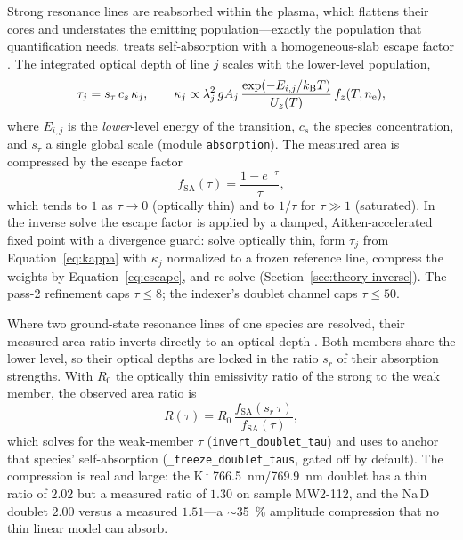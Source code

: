 Strong resonance lines are reabsorbed within the plasma, which flattens their cores
and understates the emitting population---exactly the population that quantification
needs. \alibz{} treats self-absorption with a homogeneous-slab escape factor
\citep{cowan1948selfabsorption,irons1979escape}. The
integrated optical depth of line $j$ scales with the lower-level population,
%
\begin{equation}
  \label{eq:kappa}
  \tau_j = s_\tau\,c_s\,\kappa_j,
  \qquad
  \kappa_j \propto \lambda_j^2\,gA_j\,
    \frac{\exp(-E_{i,j}/k_{\mathrm{B}} T)}{U_z(T)}\,f_z(T,n_{\mathrm{e}}),
\end{equation}
%
where $E_{i,j}$ is the \emph{lower}-level energy of the transition, $c_s$ the
species concentration, and $s_\tau$ a single global scale (module \texttt{absorption}).
The measured area is compressed by the escape factor
%
\begin{equation}
  \label{eq:escape}
  f_\mathrm{SA}(\tau) = \frac{1-e^{-\tau}}{\tau},
\end{equation}
%
which tends to $1$ as $\tau\!\rightarrow\!0$ (optically thin) and to $1/\tau$ for
$\tau\gg1$ (saturated). In the inverse solve the escape factor is applied by a
damped, Aitken-accelerated fixed point with a divergence guard: solve optically thin,
form $\tau_j$ from Equation~\eqref{eq:kappa} with $\kappa_j$ normalized to a frozen
reference line, compress the weights by Equation~\eqref{eq:escape}, and re-solve
(Section~\ref{sec:theory-inverse}). The pass-2 refinement caps $\tau\le8$; the
indexer's doublet channel caps $\tau\le50$.

Where two ground-state resonance lines of one species are resolved, their measured
area ratio inverts directly to an optical depth
\citep{elsherbini2005selfabsorption,sun2009internalreference,bulajic2002selfabsorption}. Both members share the lower level,
so their optical depths are locked in the ratio $s_r$ of their absorption strengths.
With $R_0$ the optically thin emissivity ratio of the strong to the weak member, the
observed area ratio is
%
\begin{equation}
  \label{eq:doublet}
  R(\tau) = R_0\,\frac{f_\mathrm{SA}(s_r\,\tau)}{f_\mathrm{SA}(\tau)},
\end{equation}
%
which \alibz{} solves for the weak-member $\tau$ (\texttt{invert\_doublet\_tau})
and uses to anchor that species' self-absorption (\texttt{\_freeze\_doublet\_taus},
gated off by default). The compression is real and large: the \mbox{K\,\textsc{i}}
\SI{766.5}{\nano\meter}/\SI{769.9}{\nano\meter} doublet has a thin ratio of $2.02$
but a measured ratio of $1.30$ on sample MW2-112, and the Na\,D doublet $2.00$ versus
a measured $1.51$---a $\sim$\SI{35}{\percent} amplitude compression that no thin
linear model can absorb.

